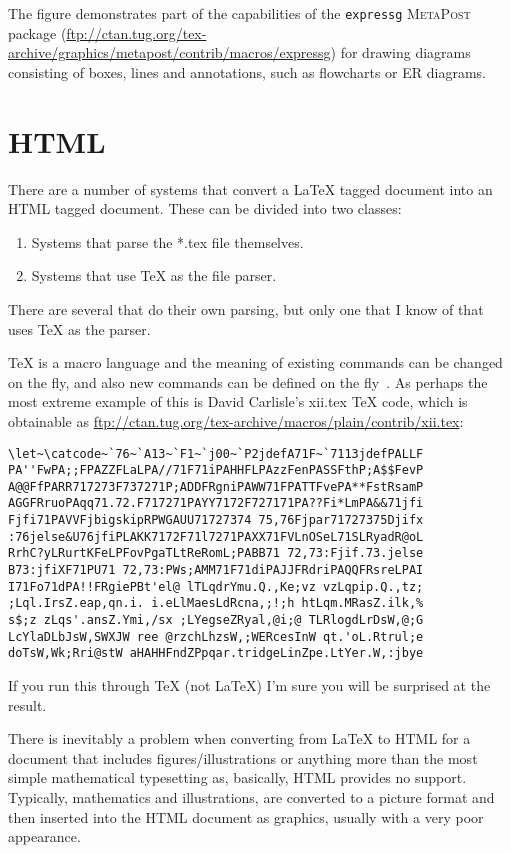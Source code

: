 \documentclass[11pt]{article}
\newcommand{\file}[1]{\textsf{#1}}
\newcommand{\program}[1]{\texttt{#1}}
\newcommand{\mpost}{\textsc{MetaPost}}
\newcommand{\tex}{TeX}
\newcommand{\latex}{LaTeX}
\begin{document}
The figure demonstrates part of the capabilities of the 
\program{expressg} \mpost{} 
package (\url{ftp://ctan.tug.org/tex-archive/graphics/metapost/contrib/macros/expressg}) for
drawing diagrams consisting of boxes, lines and annotations, such as flowcharts
or ER diagrams.


\section{HTML}

    There are a number of systems that convert a \latex{} tagged document into
an HTML tagged document. These can be divided into two classes:
\begin{enumerate}
\item Systems that parse the \file{*.tex} file themselves.
\item Systems that use \tex{} as the file parser.
\end{enumerate}
There are several that do their own parsing, but only one that I know of that
uses \tex{} as the parser.

\tex{} is a macro language and the meaning of existing 
commands can be changed on the fly, and also new commands can be defined on
the fly~\cite{KNUTH84a}. 
As perhaps the most extreme example of this is David Carlisle's
\file{xii.tex} \tex{} code, which is obtainable as 
\url{ftp://ctan.tug.org/tex-archive/macros/plain/contrib/xii.tex}: \label{code:xii}
\begin{verbatim}
\let~\catcode~`76~`A13~`F1~`j00~`P2jdefA71F~`7113jdefPALLF
PA''FwPA;;FPAZZFLaLPA//71F71iPAHHFLPAzzFenPASSFthP;A$$FevP
A@@FfPARR717273F737271P;ADDFRgniPAWW71FPATTFvePA**FstRsamP
AGGFRruoPAqq71.72.F717271PAYY7172F727171PA??Fi*LmPA&&71jfi
Fjfi71PAVVFjbigskipRPWGAUU71727374 75,76Fjpar71727375Djifx
:76jelse&U76jfiPLAKK7172F71l7271PAXX71FVLnOSeL71SLRyadR@oL
RrhC?yLRurtKFeLPFovPgaTLtReRomL;PABB71 72,73:Fjif.73.jelse
B73:jfiXF71PU71 72,73:PWs;AMM71F71diPAJJFRdriPAQQFRsreLPAI
I71Fo71dPA!!FRgiePBt'el@ lTLqdrYmu.Q.,Ke;vz vzLqpip.Q.,tz;
;Lql.IrsZ.eap,qn.i. i.eLlMaesLdRcna,;!;h htLqm.MRasZ.ilk,%
s$;z zLqs'.ansZ.Ymi,/sx ;LYegseZRyal,@i;@ TLRlogdLrDsW,@;G
LcYlaDLbJsW,SWXJW ree @rzchLhzsW,;WERcesInW qt.'oL.Rtrul;e
doTsW,Wk;Rri@stW aHAHHFndZPpqar.tridgeLinZpe.LtYer.W,:jbye
\end{verbatim}
If you run this through \tex{} (not \latex) I'm sure you will be surprised at
the result.

    There is inevitably a problem when converting from \latex{} to HTML for
a  document that includes figures/illustrations or anything more than the 
most simple mathematical
typesetting as, basically, HTML provides no support. Typically, mathematics
and illustrations, are converted to a picture format and then
inserted into the HTML document as graphics, usually with a very poor 
appearance.
\end{document}
